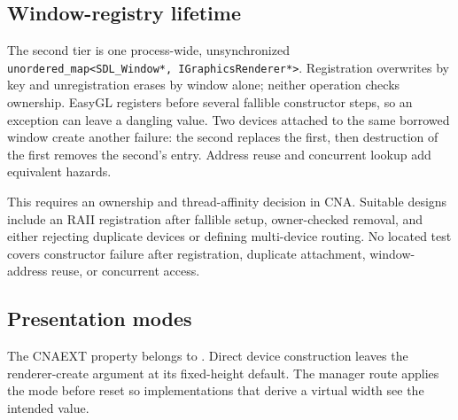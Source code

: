 \subsection{Window-registry lifetime}
\label{sec:backend-window-registry-lifetime}

The second tier is one process-wide, unsynchronized
\texttt{unordered\_map<SDL\_Window*, IGraphicsRenderer*>}. Registration overwrites by key and
unregistration erases by window alone; neither operation checks ownership. EasyGL registers
before several fallible constructor steps, so an exception can leave a dangling value. Two
devices attached to the same borrowed window create another failure: the second replaces the
first, then destruction of the first removes the second's entry. Address reuse and concurrent
lookup add equivalent hazards.

This requires an ownership and thread-affinity decision in CNA. Suitable designs include an RAII
registration after fallible setup, owner-checked removal, and either rejecting duplicate devices
or defining multi-device routing. No located test covers constructor failure after registration,
duplicate attachment, window-address reuse, or concurrent access.

\subsection{Presentation modes}
\label{sec:backend-presentation-mode-matrix}

The CNAEXT  property belongs to
. Direct device construction leaves the renderer-create argument
at its fixed-height default. The manager route applies the mode before reset so implementations
that derive a virtual width see the intended value.

